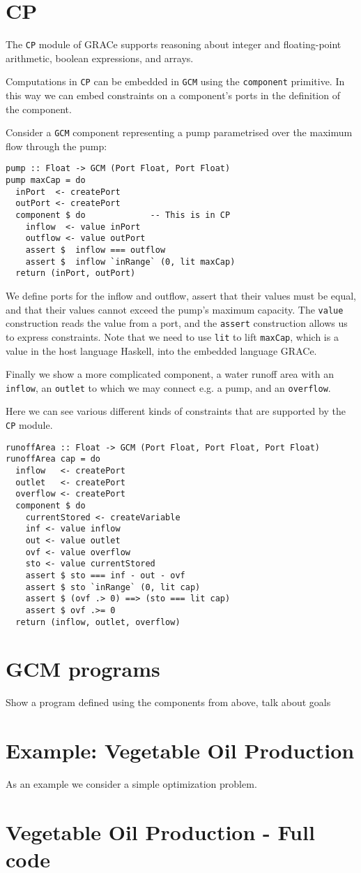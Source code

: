 \documentclass[a4paper,11pt]{article}
\begin{document}
\section{CP}
The \texttt{CP} module of GRACe supports reasoning about integer and floating-point arithmetic,
boolean expressions, and arrays.

Computations in \texttt{CP} can be embedded in \texttt{GCM} using the
\texttt{component} primitive. In this way we can embed constraints on a
component's ports in the definition of the component.

Consider a \texttt{GCM} component representing a pump
parametrised over the maximum flow through the pump:
%
\begin{verbatim}
pump :: Float -> GCM (Port Float, Port Float)
pump maxCap = do
  inPort  <- createPort
  outPort <- createPort
  component $ do             -- This is in CP
    inflow  <- value inPort
    outflow <- value outPort
    assert $  inflow === outflow
    assert $  inflow `inRange` (0, lit maxCap)
  return (inPort, outPort)
\end{verbatim}
We define ports for the inflow and outflow, assert that their values must
be equal, and that their values cannot exceed the pump's maximum capacity.
%
The \texttt{value} construction reads the value from a port,
and the \texttt{assert} construction allows us to express constraints.
%
Note that we need to use \texttt{lit} to lift \texttt{maxCap}, which
is a value in the host language Haskell, into the embedded language
GRACe.

Finally we show a more complicated component, a water runoff area with
an \texttt{inflow}, an \texttt{outlet} to which we may connect e.g. a pump,
and an \texttt{overflow}.

Here we can see various different kinds of constraints
that are supported by the \texttt{CP} module.
\begin{verbatim}
runoffArea :: Float -> GCM (Port Float, Port Float, Port Float)
runoffArea cap = do
  inflow   <- createPort
  outlet   <- createPort
  overflow <- createPort
  component $ do
    currentStored <- createVariable
    inf <- value inflow
    out <- value outlet
    ovf <- value overflow
    sto <- value currentStored
    assert $ sto === inf - out - ovf
    assert $ sto `inRange` (0, lit cap)
    assert $ (ovf .> 0) ==> (sto === lit cap)
    assert $ ovf .>= 0
  return (inflow, outlet, overflow)
\end{verbatim}

\section{GCM programs}
Show a program defined using the components from above, talk about goals

\section{Example: Vegetable Oil Production}
As an example we consider a simple optimization problem. 

\appendix
\section{Vegetable Oil Production - Full code}
\inputminted[linenos]{haskell}{examples/OilCrops.hs}
\end{document}
